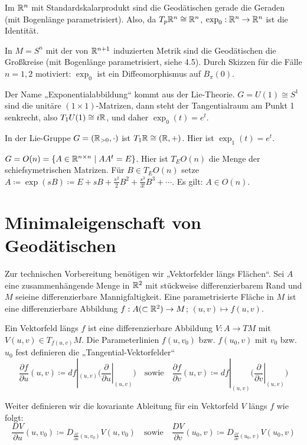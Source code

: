 \documentclass[a4paper,twoside,DIV15,BCOR12mm]{scrbook}
\renewcommand{\da}{\coloneqq}
\begin{document}
\begin{beispiele}
\item Im $\mathbb{R}^n$ mit Standardskalarprodukt sind die Geodätischen gerade die Geraden (mit Bogenlänge parametrisiert). Also, da $T_p\mathbb{R}^n \cong \mathbb{R}^n$, $\exp_0: \mathbb{R}^n \to \mathbb{R}^n$ ist die Identität.
\item In $M=S^n$ mit der von $\mathbb{R}^{n+1}$ induzierten Metrik sind die Geodätischen die Großkreise (mit Bogenlänge parametrisiert, siehe 4.5). Durch Skizzen für die Fälle $n=1,2$ motiviert: $\exp_0$ ist ein Diffeomorphismus auf $B_\pi(0)$.
\item Der Name „Exponentialabbildung“ kommt aus der Lie-Theorie. $G = U(1) \cong S^1$ sind die unitäre $(1\times 1)$-Matrizen, dann steht der Tangentialraum am Punkt 1 senkrecht, also $T_1U(1) \cong i\mathbb{R}$, und daher $\exp_0(t) = e^{t}$.
\item In der Lie-Gruppe $G=(\mathbb{R}_{>0},\cdot)$ ist $T_1\mathbb{R} \cong (\mathbb{R},+)$. Hier ist $\exp_1(t) = e^t$.
\item $G=O(n)=\{A\in \mathbb{R}^{n\times n} \mid A A^t = E \}$. Hier ist $T_EO(n)$ die Menge der schiefsymetrischen Matrizen. Für $B\in T_EO(n)$ setze $A \da \exp(sB) \da E + sB + \frac{s^2}{2}B^2 + \frac{s^3}{3!}B^3 + \cdots$. Es gilt: $A\in O(n)$.
\end{beispiele}

\section{Minimaleigenschaft von Geodätischen}

Zur technischen Vorbereitung benötigen wir „Vektorfelder längs Flächen“. Sei $A$ eine zusammenhängende Menge in $\mathbb{R}^2$ mit stückweise differenzierbarem Rand und $M$ seieine differenzierbare Mannigfaltigkeit. Eine parametrisierte Fläche in $M$ ist eine differenzierbare Abbildung $f: A (\subset \mathbb{R}^2) \to M$; $(u,v) \mapsto f(u,v)$.

Ein Vektorfeld längs $f$ ist eine differenzierbare Abbildung $V: A \to TM$ mit $V(u,v) \in T_{f(u,v)}M$. Die Parameterlinien $f(u,v_0)$ bzw. $f(u_0,v)$ mit $v_0$ bzw. $u_0$ fest definieren die „Tangential-Vektorfelder“ 
\[
\frac {\partial f}{\partial u}(u,v) \da df|_{(u,v)} \Big(\left.\frac\partial{\partial u}\right|_{(u,v)}\Big)
\quad\text{sowie}\quad
\frac {\partial f}{\partial v}(u,v) \da df|_{(u,v)} \Big(\left.\frac\partial{\partial v}\right|_{(u,v)}\Big)
\]

Weiter definieren wir die kovariante Ableitung für ein Vektorfeld $V$ längs $f$ wie folgt:
\[
\frac{DV}{\partial u}(u,v_0) \da D_{\frac{\partial f}{\partial u}(u,v_0)} V(u,v_0)
\quad\text{sowie}\quad
\frac{DV}{\partial v}(u_0,v) \da D_{\frac{\partial f}{\partial v}(u_0,v)} V(u_0,v)
\]
\end{document}
